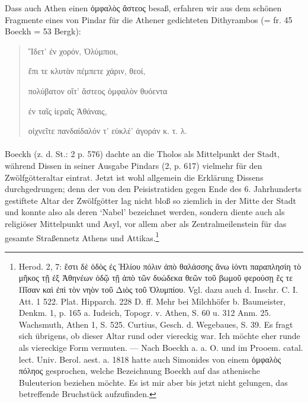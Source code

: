 \documentclass[a4paper, 11pt, oneside]{article}
\begin{document}
Dass auch Athen einen ὀμφαλὸς ἄστεος besaß, erfahren wir aus dem schönen Fragmente eines von Pindar für die Athener gedichteten Dithyrambos (= fr. 45 Boeckh = 53 Bergk):
\begin{quotation}
Ἴδετ' ἐν χορόν, Ὀλύμπιοι,

ἔπι τε κλυτὰν πέμπετε χάριν, θεοί,

πολύβατον οἵτ' ἄστεος ὀμφαλὸν θυόεντα

ἐν ταῖς ἰεραῖς Ἀθάναις,

οἰχνεῖτε πανδαίδαλόν τ' εὐκλέ' ἀγοράν κ. τ. λ.
\end{quotation}
\paragraph{}
Boeckh (z. d. St.: 2 p. 576) dachte an die Tholos als Mittelpunkt der Stadt, während Dissen in seiner Ausgabe Pindars (2, p. 617) vielmehr für den Zwölfgötteraltar eintrat. Jetzt ist wohl allgemein die Erklärung Dissens durchgedrungen; denn der von den Peisistratiden gegen Ende des 6. Jahrhunderts gestiftete Altar der Zwölfgötter lag nicht bloß so ziemlich in der Mitte der Stadt und konnte also als deren `Nabel' bezeichnet werden, sondern diente auch als religiöser Mittelpunkt und Asyl, vor allem aber als Zentralmeilenstein für das gesamte Straßennetz Athens und Attikas.\footnote{Herod. 2, 7: ἔστι δὲ ὁδὸς ἐς Ἡλίου πόλιν ἀπὸ θαλάσσης ἄνω ἰόντι παραπλησίη τὸ μῆκος τῇ ἐξ Ἀθηνέων ὁδῷ τῇ ἀπὸ τῶν δυώδεκα θεῶν τοῦ βωμοῦ φερούσῃ ἔς τε Πῖσαν καὶ ἐπὶ τὸν νηὸν τοῦ Διὸς τοῦ Ὀλυμπίου. Vgl. dazu auch d. Inschr. C. I. Att. 1 522. Plat. Hipparch. 228 D. ff. Mehr bei Milchhöfer b. Baumeister, Denkm. 1, p. 165 a. Iudeich, Topogr. v. Athen, S. 60 u. 312 Anm. 25. Wachsmuth, Athen 1, S. 525. Curtius, Gesch. d. Wegebaues, S. 39. Es fragt sich übrigens, ob dieser Altar rund oder viereckig war. Ich möchte eher runde als viereckige Form vermuten. --- Nach Boeckh a. a. O. und im Prooem. catal. lect. Univ. Berol. aest. a. 1818 hatte auch Simonides von einem ὀμφαλὸς πόληος gesprochen, welche Bezeichnung Boeckh auf das athenische Buleuterion beziehen möchte. Es ist mir aber bis jetzt nicht gelungen, das betreffende Bruchstück aufzufinden.}
\end{document}
